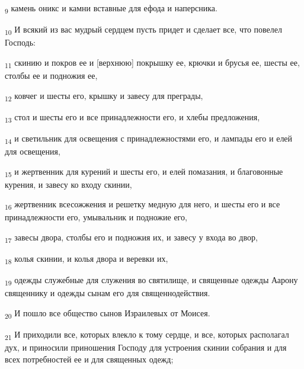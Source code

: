 \begin{tcolorbox}
\textsubscript{9} камень оникс и камни вставные для ефода и наперсника.
\end{tcolorbox}
\begin{tcolorbox}
\textsubscript{10} И всякий из вас мудрый сердцем пусть придет и сделает все, что повелел Господь:
\end{tcolorbox}
\begin{tcolorbox}
\textsubscript{11} скинию и покров ее и [верхнюю] покрышку ее, крючки и брусья ее, шесты ее, столбы ее и подножия ее,
\end{tcolorbox}
\begin{tcolorbox}
\textsubscript{12} ковчег и шесты его, крышку и завесу для преграды,
\end{tcolorbox}
\begin{tcolorbox}
\textsubscript{13} стол и шесты его и все принадлежности его, и хлебы предложения,
\end{tcolorbox}
\begin{tcolorbox}
\textsubscript{14} и светильник для освещения с принадлежностями его, и лампады его и елей для освещения,
\end{tcolorbox}
\begin{tcolorbox}
\textsubscript{15} и жертвенник для курений и шесты его, и елей помазания, и благовонные курения, и завесу ко входу скинии,
\end{tcolorbox}
\begin{tcolorbox}
\textsubscript{16} жертвенник всесожжения и решетку медную для него, и шесты его и все принадлежности его, умывальник и подножие его,
\end{tcolorbox}
\begin{tcolorbox}
\textsubscript{17} завесы двора, столбы его и подножия их, и завесу у входа во двор,
\end{tcolorbox}
\begin{tcolorbox}
\textsubscript{18} колья скинии, и колья двора и веревки их,
\end{tcolorbox}
\begin{tcolorbox}
\textsubscript{19} одежды служебные для служения во святилище, и священные одежды Аарону священнику и одежды сынам его для священнодействия.
\end{tcolorbox}
\begin{tcolorbox}
\textsubscript{20} И пошло все общество сынов Израилевых от Моисея.
\end{tcolorbox}
\begin{tcolorbox}
\textsubscript{21} И приходили все, которых влекло к тому сердце, и все, которых располагал дух, и приносили приношения Господу для устроения скинии собрания и для всех потребностей ее и для священных одежд;
\end{tcolorbox}
